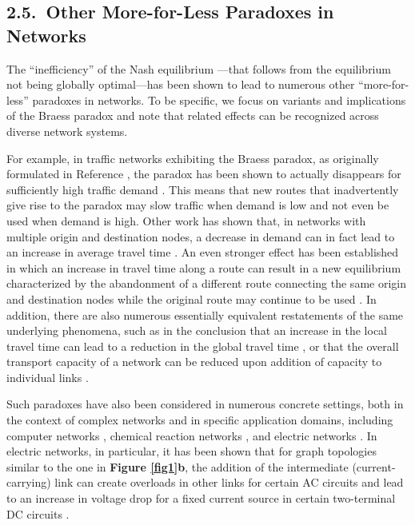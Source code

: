 \documentclass[
preprint,
superscriptaddress,
aps,
prl,
]{revtex4-1}
\begin{document}
{\color{black}
\subsection{2.5.~Other More-for-Less Paradoxes in Networks}

The ``inefficiency'' of the Nash equilibrium \cite{dubey1986inefficiency}---that follows from the equilibrium not being globally optimal---has been shown to lead to numerous other 
``more-for-less'' 
paradoxes
 in networks. 
To be specific, we focus on 
variants and implications of the Braess paradox
and note that related  effects can be recognized  across diverse network systems.  

For example, 
in traffic networks exhibiting the Braess paradox,
as originally formulated in Reference
\cite{Braess1969},
the paradox 
has been shown to
actually disappears for sufficiently high traffic demand \cite{nagurney2010negation}. This means that new routes that inadvertently give rise to the paradox may slow traffic when demand is low and not even be used when demand is high. Other work has shown that, in networks with multiple origin and destination nodes, a decrease in demand can in fact lead to an increase in average travel time \cite{fisk1979more,fujishige2017matroids}. An even stronger effect 
has been established in which  an increase in travel time along a route can result in a new equilibrium characterized by the abandonment of a different route connecting the same origin and destination nodes while the original route may continue to be used \cite{steinberg1988prevalence}. In addition, there are also numerous essentially equivalent restatements of the same underlying phenomena,  such as in the conclusion that an increase in the local travel time can lead to a reduction in the global travel time \cite{smith1978road}, or that the overall transport capacity of a network can be reduced upon addition of capacity to individual links \cite{yang1998capacity}.

Such paradoxes have also been considered in numerous concrete settings, both in the context of complex networks \cite{youn2008price,skinner2015price,sole2016congestion} and in specific application domains, including computer networks
\cite{korilis1999avoiding,kameda2000braess},
chemical reaction networks \cite{cornelius2011dispensability,lepore2011computational},  and electric networks \cite{cohen1991paradoxical,skinner2015price,blumsack2007quantitative,nagurney2016physical}.  In electric networks, in particular, it has been shown that for 
graph topologies similar to the one in \textbf{Figure \ref{fig1}b}, the addition of the intermediate (current-carrying) link can create overloads in other links for certain AC circuits \cite{blumsack2007quantitative}  and lead to an increase in voltage drop  for
a fixed current source in  certain two-terminal DC circuits  \cite{cohen1991paradoxical,nagurney2016physical}.

}
\end{document}
